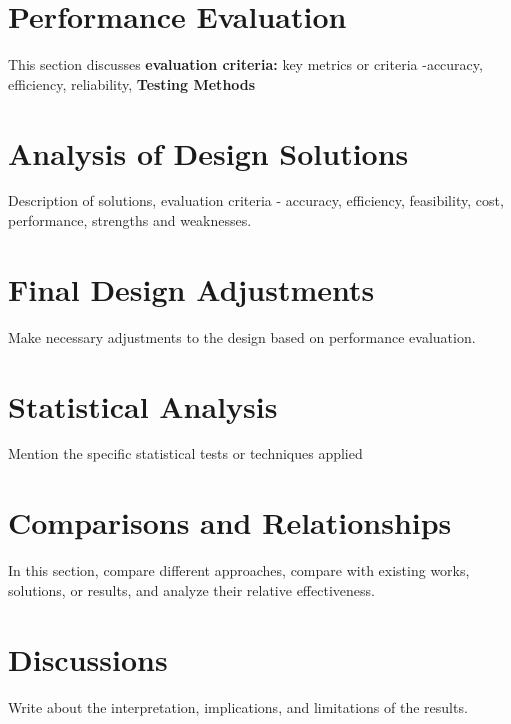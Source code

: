 \section{Performance Evaluation}
This section discusses \textbf{evaluation criteria:} key metrics or criteria -accuracy, efficiency, reliability, \textbf{Testing Methods}
\section{Analysis of Design Solutions}
Description of solutions, evaluation criteria - accuracy, efficiency, feasibility, cost, performance, strengths and weaknesses.
\section{Final Design Adjustments}
Make necessary adjustments to the design based on performance evaluation.

\section{Statistical Analysis}

Mention the specific statistical tests or techniques applied

\section{Comparisons and Relationships}

In this section, compare different approaches, compare with existing works, solutions, or results, and analyze their relative effectiveness.


\section{Discussions}
Write about the interpretation, implications, and limitations of the results.

